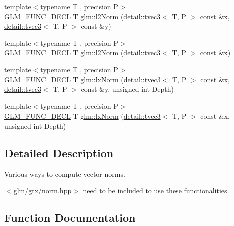 \begin{DoxyCompactItemize}
{\footnotesize template$<$typename T , precision P$>$ }\\\hyperlink{setup_8hpp_ab2d052de21a70539923e9bcbf6e83a51}{G\+L\+M\+\_\+\+F\+U\+N\+C\+\_\+\+D\+E\+CL} T \hyperlink{group__gtx__norm_ga46af6669c4e8b042e284dd3b6c0caf28}{glm\+::l2\+Norm} (\hyperlink{structglm_1_1detail_1_1tvec3}{detail\+::tvec3}$<$ T, P $>$ const \&x, \hyperlink{structglm_1_1detail_1_1tvec3}{detail\+::tvec3}$<$ T, P $>$ const \&y)
\item 
{\footnotesize template$<$typename T , precision P$>$ }\\\hyperlink{setup_8hpp_ab2d052de21a70539923e9bcbf6e83a51}{G\+L\+M\+\_\+\+F\+U\+N\+C\+\_\+\+D\+E\+CL} T \hyperlink{group__gtx__norm_gacdfd8d645b91db95a191a1294226571b}{glm\+::l2\+Norm} (\hyperlink{structglm_1_1detail_1_1tvec3}{detail\+::tvec3}$<$ T, P $>$ const \&x)
\item 
{\footnotesize template$<$typename T , precision P$>$ }\\\hyperlink{setup_8hpp_ab2d052de21a70539923e9bcbf6e83a51}{G\+L\+M\+\_\+\+F\+U\+N\+C\+\_\+\+D\+E\+CL} T \hyperlink{group__gtx__norm_gaf2ec2a2b14e0d4ddfadd5b1a98ed9799}{glm\+::lx\+Norm} (\hyperlink{structglm_1_1detail_1_1tvec3}{detail\+::tvec3}$<$ T, P $>$ const \&x, \hyperlink{structglm_1_1detail_1_1tvec3}{detail\+::tvec3}$<$ T, P $>$ const \&y, unsigned int Depth)
\item 
{\footnotesize template$<$typename T , precision P$>$ }\\\hyperlink{setup_8hpp_ab2d052de21a70539923e9bcbf6e83a51}{G\+L\+M\+\_\+\+F\+U\+N\+C\+\_\+\+D\+E\+CL} T \hyperlink{group__gtx__norm_ga7f76252fa0266db34865dba8a8c0f7d6}{glm\+::lx\+Norm} (\hyperlink{structglm_1_1detail_1_1tvec3}{detail\+::tvec3}$<$ T, P $>$ const \&x, unsigned int Depth)
\end{DoxyCompactItemize}


\subsection{Detailed Description}
Various ways to compute vector norms. 

$<$\hyperlink{norm_8hpp}{glm/gtx/norm.\+hpp}$>$ need to be included to use these functionalities. 

\subsection{Function Documentation}
\mbox{\label{group__gtx__norm_ga3544f6288d3bce2cf2a9f6ebe39e0557}} 
